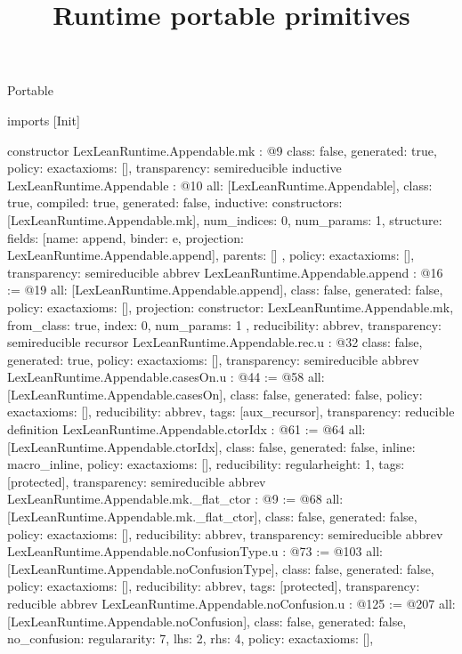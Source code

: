 \begin{lexlean}{Portable}
\title{Runtime portable primitives}
\begin{coremodule}
imports [Init]

constructor LexLeanRuntime.Appendable.mk : @9 {
  class: false,
  generated: true,
  policy: exact{axioms: []},
  transparency: semireducible
}
inductive LexLeanRuntime.Appendable : @10 {
  all: [LexLeanRuntime.Appendable],
  class: true,
  compiled: true,
  generated: false,
  inductive: {
    constructors: [LexLeanRuntime.Appendable.mk],
    num_indices: 0,
    num_params: 1,
    structure: {
      fields: [{name: append, binder: e, projection: LexLeanRuntime.Appendable.append}],
      parents: []
    }
  },
  policy: exact{axioms: []},
  transparency: semireducible
}
abbrev LexLeanRuntime.Appendable.append : @16 := @19 {
  all: [LexLeanRuntime.Appendable.append],
  class: false,
  generated: false,
  policy: exact{axioms: []},
  projection: {
    constructor: LexLeanRuntime.Appendable.mk,
    from_class: true,
    index: 0,
    num_params: 1
  },
  reducibility: abbrev{},
  transparency: semireducible
}
recursor LexLeanRuntime.Appendable.rec.{u} : @32 {
  class: false,
  generated: true,
  policy: exact{axioms: []},
  transparency: semireducible
}
abbrev LexLeanRuntime.Appendable.casesOn.{u} : @44 := @58 {
  all: [LexLeanRuntime.Appendable.casesOn],
  class: false,
  generated: false,
  policy: exact{axioms: []},
  reducibility: abbrev{},
  tags: [aux_recursor],
  transparency: reducible
}
definition LexLeanRuntime.Appendable.ctorIdx : @61 := @64 {
  all: [LexLeanRuntime.Appendable.ctorIdx],
  class: false,
  generated: false,
  inline: macro_inline,
  policy: exact{axioms: []},
  reducibility: regular{height: 1},
  tags: [protected],
  transparency: semireducible
}
abbrev LexLeanRuntime.Appendable.mk._flat_ctor : @9 := @68 {
  all: [LexLeanRuntime.Appendable.mk._flat_ctor],
  class: false,
  generated: false,
  policy: exact{axioms: []},
  reducibility: abbrev{},
  transparency: semireducible
}
abbrev LexLeanRuntime.Appendable.noConfusionType.{u} : @73 := @103 {
  all: [LexLeanRuntime.Appendable.noConfusionType],
  class: false,
  generated: false,
  policy: exact{axioms: []},
  reducibility: abbrev{},
  tags: [protected],
  transparency: reducible
}
abbrev LexLeanRuntime.Appendable.noConfusion.{u} : @125 := @207 {
  all: [LexLeanRuntime.Appendable.noConfusion],
  class: false,
  generated: false,
  no_confusion: regular{arity: 7, lhs: 2, rhs: 4},
  policy: exact{axioms: []},
}
\end{coremodule}
\end{lexlean}
